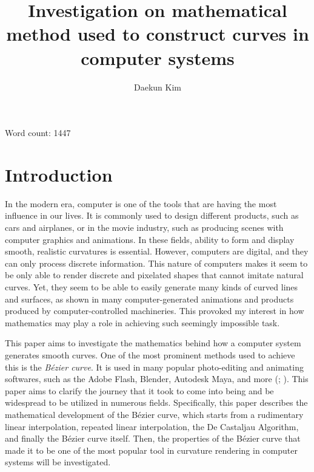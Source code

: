 \documentclass[12pt, oneside]{article}   	%
\title{Investigation on mathematical method used to construct curves in computer systems}
\author{Daekun Kim}
\numberwithin{figure}{section}
\begin{document}
\begin{titlingpage}
\maketitle
Word count: 1447
\end{titlingpage}
\tableofcontents
\newpage

\section{Introduction}
In the modern era, computer is one of the tools that are having the most influence in our lives. It is commonly used to design different products, such as cars and airplanes, or in the movie industry, such as producing scenes with computer graphics and animations. In these fields, ability to form and display smooth, realistic curvatures is essential. However, computers are digital, and they can only process discrete information. This nature of computers makes it seem to be only able to render discrete and pixelated shapes that cannot imitate natural curves. Yet, they seem to be able to easily generate many kinds of curved lines and surfaces, as shown in many computer-generated animations and products produced by computer-controlled machineries. This provoked my interest in how mathematics may play a role in achieving such seemingly impossible task.

This paper aims to investigate the mathematics behind how a computer system generates smooth curves. One of the most prominent methods used to achieve this is the \emph{B\'{e}zier curve}. It is used in many popular photo-editing and animating softwares, such as the Adobe Flash\textregistered, Blender\texttrademark, Autodesk Maya\textregistered, and more (; ). This paper aims to clarify the journey that it took to come into being and be widespread to be utilized in numerous fields. Specifically, this paper describes the mathematical development of the B\'{e}zier curve, which starts from a rudimentary linear interpolation, repeated linear interpolation, the De Castaljau Algorithm, and finally the B\'{e}zier curve itself. Then, the properties of the B\'{e}zier curve that made it to be one of the most popular tool in curvature rendering in computer systems will be investigated.
\end{document}
